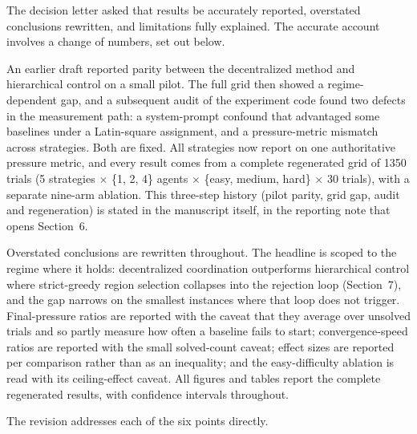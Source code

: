 \documentclass[11pt]{article}
\begin{document}
The decision letter asked that results be accurately reported, overstated conclusions rewritten, and limitations fully explained. The accurate account involves a change of numbers, set out below.

An earlier draft reported parity between the decentralized method and hierarchical control on a small pilot. The full grid then showed a regime-dependent gap, and a subsequent audit of the experiment code found two defects in the measurement path: a system-prompt confound that advantaged some baselines under a Latin-square assignment, and a pressure-metric mismatch across strategies. Both are fixed. All strategies now report on one authoritative pressure metric, and every result comes from a complete regenerated grid of 1350 trials (5 strategies $\times$ \{1, 2, 4\} agents $\times$ \{easy, medium, hard\} $\times$ 30 trials), with a separate nine-arm ablation. This three-step history (pilot parity, grid gap, audit and regeneration) is stated in the manuscript itself, in the reporting note that opens Section~6.

Overstated conclusions are rewritten throughout. The headline is scoped to the regime where it holds: decentralized coordination outperforms hierarchical control where strict-greedy region selection collapses into the rejection loop (Section~7), and the gap narrows on the smallest instances where that loop does not trigger. Final-pressure ratios are reported with the caveat that they average over unsolved trials and so partly measure how often a baseline fails to start; convergence-speed ratios are reported with the small solved-count caveat; effect sizes are reported per comparison rather than as an inequality; and the easy-difficulty ablation is read with its ceiling-effect caveat. All figures and tables report the complete regenerated results, with confidence intervals throughout.

\bigskip
\noindent The revision addresses each of the six points directly.
\end{document}
